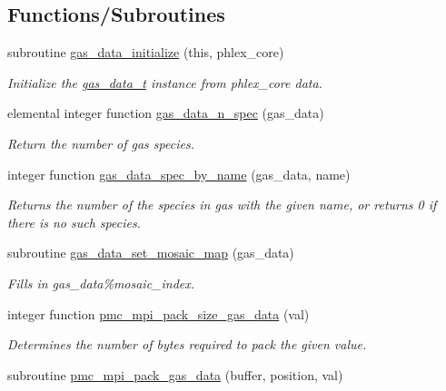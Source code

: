 \subsection*{Functions/\+Subroutines}
\begin{DoxyCompactItemize}
\item 
subroutine \mbox{\hyperlink{namespacepmc__gas__data_af46c599614532ddd2e6741a0a7bed14e}{gas\+\_\+data\+\_\+initialize}} (this, phlex\+\_\+core)
\begin{DoxyCompactList}\small\item\em Initialize the \mbox{\hyperlink{structpmc__gas__data_1_1gas__data__t}{gas\+\_\+data\+\_\+t}} instance from phlex\+\_\+core data. \end{DoxyCompactList}\item 
elemental integer function \mbox{\hyperlink{namespacepmc__gas__data_a6d07e1703ded54713052541e011ecd9f}{gas\+\_\+data\+\_\+n\+\_\+spec}} (gas\+\_\+data)
\begin{DoxyCompactList}\small\item\em Return the number of gas species. \end{DoxyCompactList}\item 
integer function \mbox{\hyperlink{namespacepmc__gas__data_abda315c8ecc2afa6bc10d648140c4258}{gas\+\_\+data\+\_\+spec\+\_\+by\+\_\+name}} (gas\+\_\+data, name)
\begin{DoxyCompactList}\small\item\em Returns the number of the species in gas with the given name, or returns 0 if there is no such species. \end{DoxyCompactList}\item 
subroutine \mbox{\hyperlink{namespacepmc__gas__data_afb086646f86c38de197f098dafac1ddb}{gas\+\_\+data\+\_\+set\+\_\+mosaic\+\_\+map}} (gas\+\_\+data)
\begin{DoxyCompactList}\small\item\em Fills in gas\+\_\+data\%mosaic\+\_\+index. \end{DoxyCompactList}\item 
integer function \mbox{\hyperlink{namespacepmc__gas__data_a53801cb841f5a4c6fe9618de7e33637f}{pmc\+\_\+mpi\+\_\+pack\+\_\+size\+\_\+gas\+\_\+data}} (val)
\begin{DoxyCompactList}\small\item\em Determines the number of bytes required to pack the given value. \end{DoxyCompactList}\item 
subroutine \mbox{\hyperlink{namespacepmc__gas__data_a50ae39f0438bbc196fc40825dde0385e}{pmc\+\_\+mpi\+\_\+pack\+\_\+gas\+\_\+data}} (buffer, position, val)

\end{DoxyCompactItemize}
